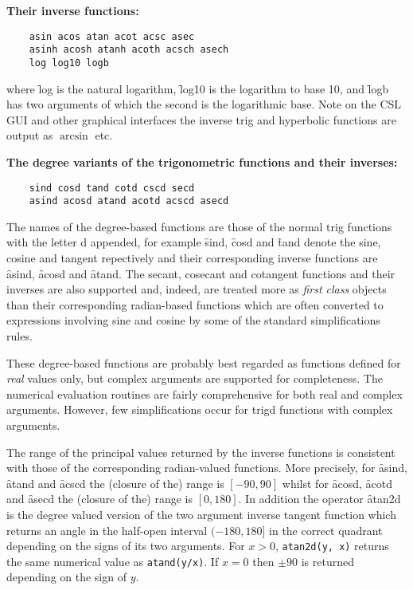 \textbf{Their inverse functions:}
\begin{verbatim}
    asin acos atan acot acsc asec
    asinh acosh atanh acoth acsch asech
    log log10 logb
\end{verbatim}
where \f{log} is the natural logarithm, \f{log10} is the logarithm to
base 10, and \f{logb} has two arguments of which the second is the
logarithmic base.
Note on the CSL GUI and other graphical interfaces
the inverse trig and hyperbolic functions are output as $\arcsin$ etc.

\textbf{The degree variants of the trigonometric functions and their inverses:}
\begin{verbatim}
    sind cosd tand cotd cscd secd
    asind acosd atand acotd acscd asecd
\end{verbatim}
The names of the degree-based functions are those of the normal trig
functions with the letter d appended, for example \f{sind}, \f{cosd}
and \f{tand} denote the sine, cosine and tangent repectively and their
corresponding inverse functions are \f{asind}, \f{acosd} and
\f{atand}. The secant, cosecant and cotangent functions and their
inverses are also supported and, indeed, are treated more as
\textit{first class} objects than their corresponding radian-based
functions which are often converted to expressions involving sine and
cosine by some of the standard {\REDUCE} simplifications rules.

These degree-based functions are probably best regarded as functions
defined for \emph{real} values only, but complex arguments are
supported for completeness. The numerical evaluation routines are
fairly comprehensive for both real and complex arguments. However, few
simplifications occur for trigd functions with complex arguments.

The range of the principal values returned by the inverse functions is
consistent with those of the corresponding radian-valued functions.
More precisely, for \f{asind}, \f{atand} and \f{acscd} the (closure of
the) range is $[-90, 90]$ whilst for \f{acosd}, \f{acotd} and
\f{asecd} the (closure of the) range is $[0, 180]$. In addition the
operator \f{atan2d} is the degree valued version of the two argument
inverse tangent function which returns an angle in the half-open
interval $(-180, 180]$ in the correct quadrant depending on the signs
of its two arguments. For $x>0$, \texttt{atan2d(y, x)} returns the
same numerical value as \texttt{atand(y/x)}. If $x=0$ then $\pm 90$ is
returned depending on the sign of $y$.

